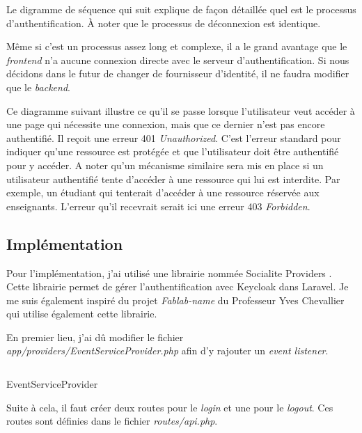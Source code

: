 Le digramme de séquence qui suit explique de façon détaillée quel est le processus d'authentification. À noter que le processus de déconnexion est identique.

Même si c'est un processus assez long et complexe, il a le grand avantage que le \emph{frontend} n'a aucune connexion directe avec le serveur d'authentification. Si nous décidons dans le futur de changer de fournisseur d'identité, il ne faudra modifier que le \emph{backend}.


Ce diagramme suivant illustre ce qu'il se passe lorsque l'utilisateur veut accéder à une page qui nécessite une connexion, mais que ce dernier n'est pas encore authentifié. Il reçoit une erreur 401 \emph{Unauthorized}. C'est l'erreur standard pour indiquer qu'une ressource est protégée et que l'utilisateur doit être authentifié pour y accéder. A noter qu'un mécanisme similaire sera mis en place si un utilisateur authentifié tente d'accéder à une ressource qui lui est interdite. Par exemple, un étudiant qui tenterait d'accéder à une ressource réservée aux enseignants. L'erreur qu'il recevrait serait ici une erreur 403 \emph{Forbidden}.

\subsection{Implémentation}
Pour l'implémentation, j'ai utilisé une librairie nommée Socialite Providers \cite{SocialiteProviders}. Cette librairie permet de gérer l'authentification avec Keycloak dans Laravel. Je me suis également inspiré du projet \emph{Fablab-name} \cite{FablabName} du Professeur Yves Chevallier qui utilise également cette librairie.

En premier lieu, j'ai dû modifier le fichier \emph{app/providers/EventServiceProvider.php} afin d'y rajouter un \emph{event listener}.
\begin{listing}[H]
    \inputminted{php}{assets/code/serviceProviderkeycloak.php}
    \caption{EventServiceProvider \label{serviceProviderkeycloak}}
\end{listing}

Suite à cela, il faut créer deux routes pour le \emph{login} et une pour le \emph{logout}. Ces routes sont définies dans le fichier \emph{routes/api.php}.

